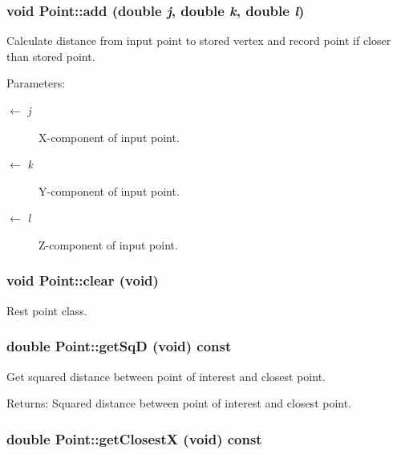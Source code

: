 \subsubsection{\setlength{\rightskip}{0pt plus 5cm}void Point::add (double {\em j}, double {\em k}, double {\em l})}\label{classPoint_6938afca6d4cd230f4d530cd6ae16b80}


Calculate distance from input point to stored vertex and record point if closer than stored point. \begin{Desc}
\item[Parameters:]
\begin{description}
\item[\mbox{$\leftarrow$} {\em j}]X-component of input point. \item[\mbox{$\leftarrow$} {\em k}]Y-component of input point. \item[\mbox{$\leftarrow$} {\em l}]Z-component of input point. \end{description}
\end{Desc}
\subsubsection{\setlength{\rightskip}{0pt plus 5cm}void Point::clear (void)}\label{classPoint_94c329b9d3931d52caaf9b78b51af862}


Rest point class. 
\subsubsection{\setlength{\rightskip}{0pt plus 5cm}double Point::get\-Sq\-D (void) const}\label{classPoint_380d4bd8b7e69e1627fbcbfa6dc54aa2}


Get squared distance between point of interest and closest point. \begin{Desc}
\item[Returns:]Squared distance between point of interest and closest point. \end{Desc}
\subsubsection{\setlength{\rightskip}{0pt plus 5cm}double Point::get\-Closest\-X (void) const}\label{classPoint_d3bece00dbeb2b861647e8bf7458303c}


